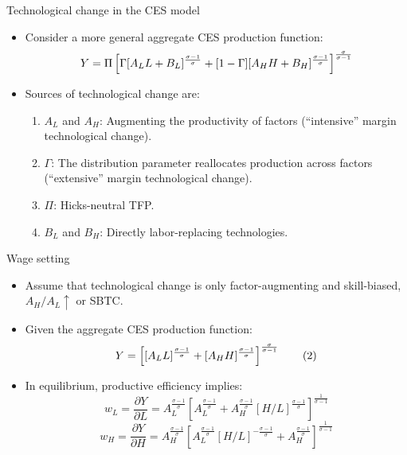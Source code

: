 \documentclass[notes=show]{beamer}
\begin{document}
\begin{frame}{Technological change in the CES model}
\begin{itemize}
\item Consider a more general aggregate CES production function:
\[
Y=\Pi \left[ \Gamma [A_{L}L + B_{L}]^{\frac{\sigma -1}{\sigma }}+[1-\Gamma][A_{H}H + B_{H}]^{%
\frac{\sigma -1}{\sigma }}\right] ^{\frac{ \sigma }{\sigma -1}} 
\]
\item Sources of technological change are: \smallskip
\begin{enumerate}
\item $A_{L}$ and $A_{H}$: Augmenting the productivity of factors (``intensive'' margin technological change). \smallskip
\item $ \Gamma $: The distribution parameter reallocates production across factors (``extensive'' margin technological change). \smallskip
\item $ \Pi $: Hicks-neutral TFP.  \smallskip
\item $ B_{L} $ and $ B_{H} $: Directly labor-replacing technologies. 
\end{enumerate}
\end{itemize}
\end{frame}

\begin{frame}{Wage setting}
\begin{itemize}
\item Assume that technological change is only factor-augmenting and skill-biased, $A_{H}/A_{L} \uparrow$ or SBTC. \medskip
\item Given the aggregate CES production function:
\[
Y=\left[ [A_{L}L]^{\frac{\sigma -1}{\sigma }} + [A_{H}H]^{%
\frac{\sigma -1}{\sigma }}\right] ^{\frac{\sigma }{\sigma -1}} \tag{2} \label{eq2}
\]
\item In equilibrium, productive efficiency implies:
\[
w_{L}=\frac{\partial Y}{\partial L}=A_{L}^{\frac{\sigma - 1}{\sigma }} \left[ A_{L}^{\frac{\sigma - 1}{\sigma}} + A_{H}^{\frac{\sigma - 1}{\sigma}} [H/L]^{\frac{\sigma - 1}{\sigma}} \right] ^{\frac{1}{\sigma - 1}} \tag{3} \label{eq3}
\]
\[
w_{H}=\frac{\partial Y}{\partial H}=A_{H}^{\frac{\sigma - 1}{\sigma }} \left[ A_{L}^{\frac{\sigma - 1}{\sigma}} [H/L]^{-\frac{\sigma - 1}{\sigma}} + A_{H}^{\frac{\sigma - 1}{\sigma}}  \right] ^{\frac{1}{\sigma - 1}} \tag{4} \label{eq4}
\]
\end{itemize}
\end{frame}
\end{document}

